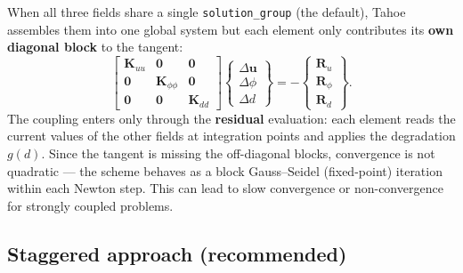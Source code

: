 \documentclass[11pt,a4paper]{article}
\newcommand{\uu}{\bm{u}}
\begin{document}
When all three fields share a single \texttt{solution\_group} (the default), Tahoe assembles them into one global system but each element only contributes its \textbf{own diagonal block} to the tangent:
\begin{equation}
    \begin{bmatrix}
        \bm{K}_{uu} & \bm{0} & \bm{0} \\
        \bm{0} & \bm{K}_{\phi\phi} & \bm{0} \\
        \bm{0} & \bm{0} & \bm{K}_{dd}
    \end{bmatrix}
    \begin{Bmatrix}
        \Delta \uu \\ \Delta \phi \\ \Delta d
    \end{Bmatrix}
    = -
    \begin{Bmatrix}
        \bm{R}_u \\ \bm{R}_\phi \\ \bm{R}_d
    \end{Bmatrix}.
\end{equation}
The coupling enters only through the \textbf{residual} evaluation: each element reads the current values of the other fields at integration points and applies the degradation $g(d)$. Since the tangent is missing the off-diagonal blocks, convergence is not quadratic --- the scheme behaves as a block Gauss--Seidel (fixed-point) iteration within each Newton step. This can lead to slow convergence or non-convergence for strongly coupled problems.

\subsection{Staggered approach (recommended)}
\end{document}
